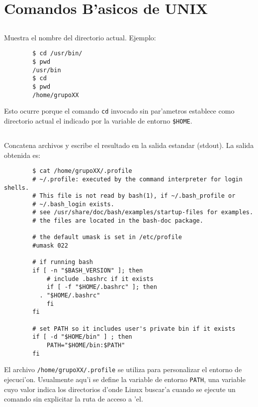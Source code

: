 \newenvironment{mylisting}
{\begin{list}{}{\setlength{\leftmargin}{1em}}\item\scriptsize\bfseries}
{\end{list}}

\newenvironment{mytinylisting}
{\begin{list}{}{\setlength{\leftmargin}{1em}}\item\tiny\bfseries}
{\end{list}}

\section{Comandos B'asicos de UNIX}
\subsection{}
Muestra el nombre del directorio actual. Ejemplo:\\
      \begin{mylisting}
      \begin{verbatim}        
        $ cd /usr/bin/
        $ pwd
        /usr/bin
        $ cd
        $ pwd
        /home/grupoXX
      \end{verbatim}
      \end{mylisting}
Esto ocurre porque el comando \texttt{cd} invocado sin par'ametros establece como directorio actual el indicado por la variable de entorno \texttt{\$HOME}.

\subsection{}
Concatena archivos y escribe el resultado en la salida estandar \mbox{(stdout)}. La salida obtenida es:\\
      \begin{mylisting}
      \begin{verbatim}
        $ cat /home/grupoXX/.profile
        # ~/.profile: executed by the command interpreter for login shells.
        # This file is not read by bash(1), if ~/.bash_profile or 
        # ~/.bash_login exists.
        # see /usr/share/doc/bash/examples/startup-files for examples.
        # the files are located in the bash-doc package.

        # the default umask is set in /etc/profile
        #umask 022

        # if running bash
        if [ -n "$BASH_VERSION" ]; then
            # include .bashrc if it exists
            if [ -f "$HOME/.bashrc" ]; then
          . "$HOME/.bashrc"
            fi
        fi

        # set PATH so it includes user's private bin if it exists
        if [ -d "$HOME/bin" ] ; then
            PATH="$HOME/bin:$PATH"
        fi
      \end{verbatim}
      \end{mylisting}
El archivo \texttt{/home/grupoXX/.profile} se utiliza para personalizar el entorno de ejecuci'on. Usualmente aqu'i se define la variable de entorno \texttt{PATH}, una variable cuyo valor indica los directorios d'onde Linux buscar'a cuando se ejecute un comando sin explicitar la ruta de acceso a 'el.

